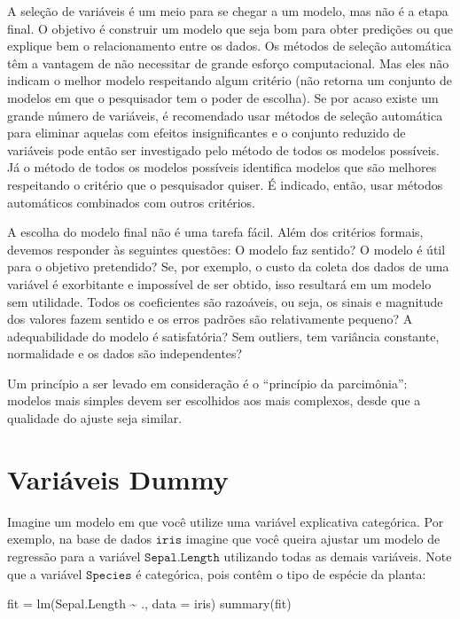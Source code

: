 \documentclass[
]{book}
\newenvironment{Shaded}{\begin{snugshade}}{\end{snugshade}}
\newcommand{\AttributeTok}[1]{\textcolor[rgb]{0.77,0.63,0.00}{#1}}
\newcommand{\FunctionTok}[1]{\textcolor[rgb]{0.00,0.00,0.00}{#1}}
\newcommand{\NormalTok}[1]{#1}
\newcommand{\OtherTok}[1]{\textcolor[rgb]{0.56,0.35,0.01}{#1}}
\newcommand{\SpecialCharTok}[1]{\textcolor[rgb]{0.00,0.00,0.00}{#1}}
\begin{document}
A seleção de variáveis é um meio para se chegar a um modelo, mas não é a etapa final. O objetivo é construir um modelo que seja bom para obter predições ou que explique bem o relacionamento entre os dados. Os métodos de seleção automática têm a vantagem de não necessitar de grande esforço computacional. Mas eles não indicam o melhor modelo respeitando algum critério (não retorna um conjunto de modelos em que o pesquisador tem o poder de escolha). Se por acaso existe um grande número de variáveis, é recomendado usar métodos de seleção automática para eliminar aquelas com efeitos insignificantes e o conjunto reduzido de variáveis pode então ser investigado pelo método de todos os modelos possíveis. Já o método de todos os modelos possíveis identifica modelos que são melhores respeitando o critério que o pesquisador quiser. É indicado, então, usar métodos automáticos combinados com outros critérios.

A escolha do modelo final não é uma tarefa fácil. Além dos critérios formais, devemos responder às seguintes questões: O modelo faz sentido? O modelo é útil para o objetivo pretendido? Se, por exemplo, o custo da coleta dos dados de uma variável é exorbitante e impossível de ser obtido, isso resultará em um modelo sem utilidade. Todos os coeficientes são razoáveis, ou seja, os sinais e magnitude dos valores fazem sentido e os erros padrões são relativamente pequeno? A adequabilidade do modelo é satisfatória? Sem outliers, tem variância constante, normalidade e os dados são independentes?

Um princípio a ser levado em consideração é o ``princípio da parcimônia'': modelos mais simples devem ser escolhidos aos mais complexos, desde que a qualidade do ajuste seja similar.

\hypertarget{variuxe1veis-dummy}{%
\section{Variáveis Dummy}\label{variuxe1veis-dummy}}

Imagine um modelo em que você utilize uma variável explicativa categórica. Por exemplo, na base de dados \(\texttt{iris}\) imagine que você queira ajustar um modelo de regressão para a variável \(\texttt{Sepal.Length}\) utilizando todas as demais variáveis. Note que a variável \(\texttt{Species}\) é categórica, pois contêm o tipo de espécie da planta:

\begin{Shaded}
\begin{Highlighting}[]
\NormalTok{fit }\OtherTok{=} \FunctionTok{lm}\NormalTok{(Sepal.Length }\SpecialCharTok{\textasciitilde{}}\NormalTok{ ., }\AttributeTok{data =}\NormalTok{ iris)}
\FunctionTok{summary}\NormalTok{(fit)}
\end{Highlighting}
\end{Shaded}
\end{document}
